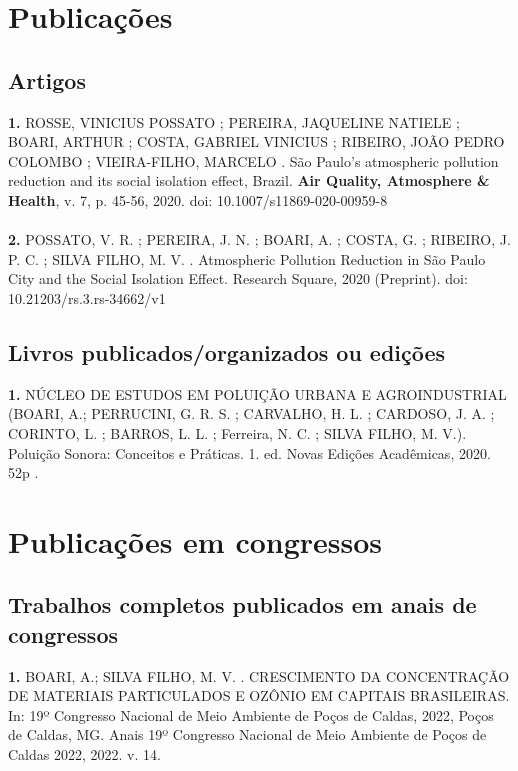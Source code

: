 \documentclass[12pt,a4paper,sans]{moderncv}        %
\renewcommand*{\bibliographyitemlabel}{[\arabic{enumiv}]}
\begin{document}
	
	
	\section{Publicações}
	\subsection*{Artigos}
\textbf{1.}	ROSSE, VINICIUS POSSATO ; PEREIRA, JAQUELINE NATIELE ; BOARI, ARTHUR ; COSTA, GABRIEL VINICIUS ; RIBEIRO, JOÃO PEDRO COLOMBO ; VIEIRA-FILHO, MARCELO . São Paulo's atmospheric pollution reduction and its social isolation effect, Brazil. \textbf{Air Quality, Atmosphere \& Health}, v. 7, p. 45-56, 2020. doi: 10.1007/s11869-020-00959-8
\\ \\
\textbf{2.} POSSATO, V. R. ; PEREIRA, J. N. ; BOARI, A. ; COSTA, G. ; RIBEIRO, J. P. C. ; SILVA FILHO, M. V. . Atmospheric Pollution Reduction in São Paulo City and the Social Isolation Effect. Research Square, 2020 (Preprint). doi: 10.21203/rs.3.rs-34662/v1

\subsection*{Livros publicados/organizados ou edições}

\textbf{1.} NÚCLEO DE ESTUDOS EM POLUIÇÃO URBANA E AGROINDUSTRIAL (BOARI, A.; PERRUCINI, G. R. S. ; CARVALHO, H. L. ; CARDOSO, J. A. ; CORINTO, L. ; BARROS, L. L. ; Ferreira, N. C. ; SILVA FILHO, M. V.). Poluição Sonora: Conceitos e Práticas. 1. ed. Novas Edições Acadêmicas, 2020. 52p .

	\section*{Publicações em congressos}
	\subsection*{Trabalhos completos publicados em anais de congressos}
	
	\textbf{1.} BOARI, A.; SILVA FILHO, M. V. . CRESCIMENTO DA CONCENTRAÇÃO DE MATERIAIS PARTICULADOS E OZÔNIO EM CAPITAIS BRASILEIRAS. In: 19º Congresso Nacional de Meio Ambiente de Poços de Caldas, 2022, Poços de Caldas, MG. Anais 19º Congresso Nacional de Meio Ambiente de Poços de Caldas 2022, 2022. v. 14.
	
\end{document}
